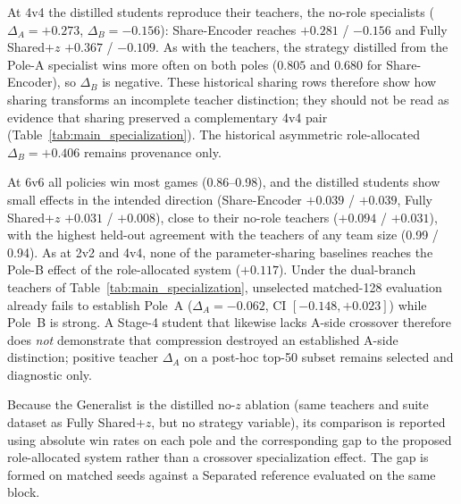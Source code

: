 At 4v4 the distilled students reproduce their teachers, the no-role specialists
($\Delta_A=+0.273$, $\Delta_B=-0.156$): Share-Encoder reaches $+0.281$ /
$-0.156$ and Fully Shared+$z$ $+0.367$ / $-0.109$. As with the teachers, the
strategy distilled from the Pole-A specialist wins more often on both poles
($0.805$ and $0.680$ for Share-Encoder), so $\Delta_B$ is negative. These
historical sharing rows therefore show how sharing transforms an incomplete
teacher distinction; they should not be read as evidence that sharing
preserved a complementary 4v4 pair
(Table~\ref{tab:main_specialization}). The historical asymmetric
role-allocated $\Delta_B=+0.406$ remains provenance only.

At 6v6 all policies win most games (0.86--0.98), and the distilled students
show small effects in the intended direction (Share-Encoder $+0.039$ /
$+0.039$, Fully Shared+$z$ $+0.031$ / $+0.008$), close to their no-role
teachers ($+0.094$ / $+0.031$), with the highest held-out agreement with the
teachers of any team size (0.99 / 0.94). As at 2v2 and 4v4, none of the
parameter-sharing baselines reaches the Pole-B effect of the role-allocated
system ($+0.117$).
Under the dual-branch teachers of Table~\ref{tab:main_specialization},
unselected matched-128 evaluation already fails to establish Pole~A
($\Delta_A=-0.062$, CI $[-0.148,+0.023]$) while Pole~B is strong. A Stage-4
student that likewise lacks A-side crossover therefore does
\emph{not} demonstrate that compression destroyed an established A-side
distinction; positive teacher $\Delta_A$ on a post-hoc top-50 subset remains
selected and diagnostic only.

Because the Generalist is the distilled no-$z$ ablation (same teachers and
suite dataset as Fully Shared+$z$, but no strategy variable), its comparison
is reported using absolute win rates on each pole and the corresponding gap
to the proposed role-allocated system rather than a crossover specialization
effect. The gap is formed on matched seeds against a Separated reference
evaluated on the same block.

